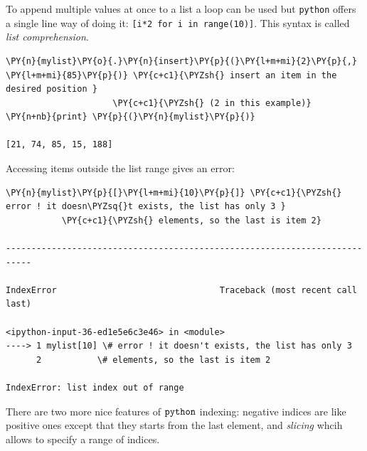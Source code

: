 To append multiple values at once to a list a loop can be used but \texttt{python} offers a single line way of doing it: \texttt{[i*2 for i in range(10)]}. This syntax is called \emph{list comprehension}.

\begin{tcolorbox}[breakable, size=fbox, boxrule=1pt, pad at break*=1mm, colback=cellbackground, colframe=cellborder]
\begin{Verbatim}[commandchars=\\\{\}]
\PY{n}{mylist}\PY{o}{.}\PY{n}{insert}\PY{p}{(}\PY{l+m+mi}{2}\PY{p}{,} \PY{l+m+mi}{85}\PY{p}{)} \PY{c+c1}{\PYZsh{} insert an item in the desired position }
                     \PY{c+c1}{\PYZsh{} (2 in this example)}
\PY{n+nb}{print} \PY{p}{(}\PY{n}{mylist}\PY{p}{)}

[21, 74, 85, 15, 188]
\end{Verbatim}
\end{tcolorbox}

Accessing items outside the list range gives an error:

\begin{tcolorbox}[breakable, size=fbox, boxrule=1pt, pad at break*=1mm, colback=cellbackground, colframe=cellborder]
\begin{Verbatim}[commandchars=\\\{\}]
\PY{n}{mylist}\PY{p}{[}\PY{l+m+mi}{10}\PY{p}{]} \PY{c+c1}{\PYZsh{} error ! it doesn\PYZsq{}t exists, the list has only 3 }
           \PY{c+c1}{\PYZsh{} elements, so the last is item 2}

---------------------------------------------------------------------------

IndexError                                Traceback (most recent call last)

<ipython-input-36-ed1e5e6c3e46> in <module>
----> 1 mylist[10] \# error ! it doesn't exists, the list has only 3
      2           \# elements, so the last is item 2

IndexError: list index out of range
\end{Verbatim}
\end{tcolorbox}

There are two more nice features of $\tt{python}$ indexing: negative
indices are like positive ones except that they starts from the last
element, and \emph{slicing} whcih allows to specify a range of indices.

